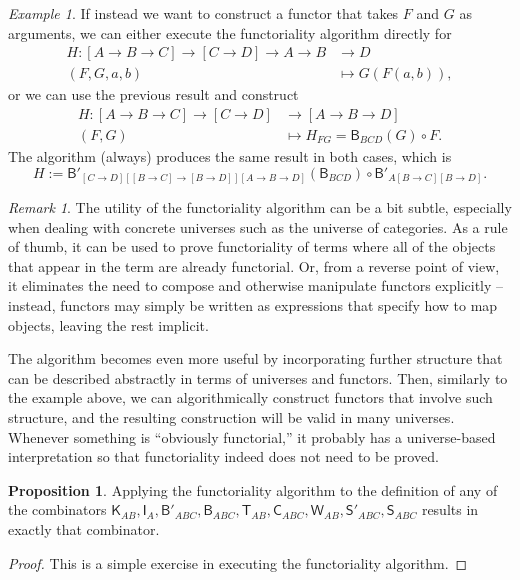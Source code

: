 \documentclass[a4paper]{article}
\theoremstyle{definition}
\newtheorem{proposition}[definition]{Proposition}
\theoremstyle{remark}
\newtheorem*{remark}{Remark}
\newtheorem*{example}{Example}
\newcommand{\nm}{\mathsf}
\newcommand{\combinator}{\nm}
\newcommand{\idFun}{\combinator{I}}
\newcommand{\revAppFun}{\combinator{T}}
\newcommand{\constFun}{\combinator{K}}
\newcommand{\compFun}{\combinator{B'}}
\newcommand{\revCompFun}{\combinator{B}}
\newcommand{\swapFun}{\combinator{C}}
\newcommand{\dupFun}{\combinator{W}}
\newcommand{\substFun}{\combinator{S'}}
\newcommand{\revSubstFun}{\combinator{S}}
\begin{document}
\begin{example}
  If instead we want to construct a functor that takes $F$ and $G$ as
  arguments, we can either execute the functoriality algorithm directly for
  \begin{align*}
    H : [A \to B \to C] \to [C \to D] \to A \to B &\to     D\\
        (F,G,a,b)                                 &\mapsto G(F(a,b)),
  \end{align*}
  or we can use the previous result and construct
  \begin{align*}
    H : [A \to B \to C] \to [C \to D] &\to     [A \to B \to D]\\
        (F,G)                         &\mapsto H_{FG} = \revCompFun_{BCD}(G) \circ F.
  \end{align*}
  The algorithm (always) produces the same result in both cases, which is
  \[H := \compFun_{[C{\to}D][[B{\to}C]{\to}[B{\to}D]][A{\to}B{\to}D]}(\revCompFun_{BCD}) \circ \compFun_{A[B{\to}C][B{\to}D]}.\]
\end{example}

\begin{remark}
  The utility of the functoriality algorithm can be a bit subtle, especially when dealing
  with concrete universes such as the universe of categories. As a rule of thumb, it can
  be used to prove functoriality of terms where all of the objects that appear in the term
  are already functorial. Or, from a reverse point of view, it eliminates the need to
  compose and otherwise manipulate functors explicitly -- instead, functors may simply be
  written as expressions that specify how to map objects, leaving the rest implicit.

  The algorithm becomes even more useful by incorporating further structure that can be
  described abstractly in terms of universes and functors. Then, similarly to the example
  above, we can algorithmically construct functors that involve such structure, and the
  resulting construction will be valid in many universes. Whenever something is
  ``obviously functorial,'' it probably has a universe-based interpretation so that
  functoriality indeed does not need to be proved.
\end{remark}

\begin{proposition}
  \label{prp:funop-def}
  Applying the functoriality algorithm to the definition of any of the combinators
  $\constFun_{AB},\idFun_A,\compFun_{ABC},\revCompFun_{ABC},\revAppFun_{AB},\swapFun_{ABC},\dupFun_{AB},\substFun_{ABC},\revSubstFun_{ABC}$
  results in exactly that combinator.
\end{proposition}
\vspace{-1ex}
\begin{proof}
  This is a simple exercise in executing the functoriality algorithm.
\end{proof}
\end{document}
